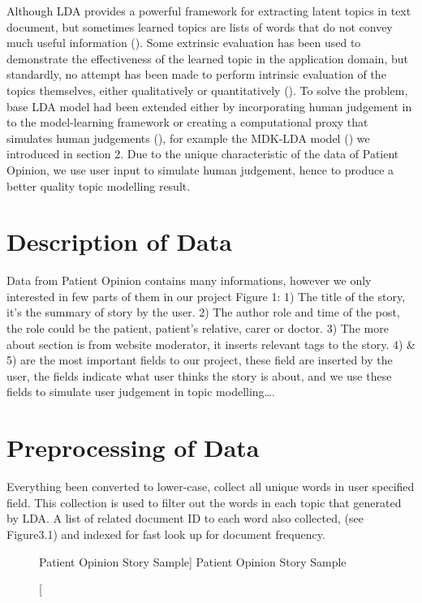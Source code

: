 \documentclass[11pt,twoside]{report}
\begin{document}
Although LDA provides a powerful framework for extracting latent topics in text document, but sometimes learned topics are lists of words that do not convey much useful information (\cite{ref26}). Some extrinsic evaluation has been used to demonstrate the effectiveness of the learned topic in the application domain, but standardly, no attempt has been made to perform intrinsic evaluation of the topics themselves, either qualitatively or quantitatively (\cite{ref27}). To solve the problem, base LDA model had been extended either by incorporating human judgement in to the model-learning framework or creating a computational proxy that simulates human judgements (\cite{ref28}), for example the MDK-LDA model (\cite{ref24}) we introduced in section 2.
Due to the unique characteristic of the data of Patient Opinion, we use user input to simulate human judgement, hence to produce a better quality topic modelling result.

\section{Description of Data}

Data from Patient Opinion contains many informations, however we only interested in few parts of them in our project Figure 1: 1) The title of the story, it’s the summary of story by the user. 2) The author role and time of the post, the role could be the patient, patient’s relative, carer or doctor. 3) The more about section is from website moderator, it inserts relevant tags to the story. 4) \& 5) are the most important fields to our project, these field are inserted by the user, the fields indicate what user thinks the story is about, and we use these fields to simulate user judgement in topic modelling….

\section{Preprocessing of Data}

Everything been converted to lower-case, collect all unique words in user specified field. This collection is used to filter out the words in each topic that generated by LDA. A list of related document ID to each word also collected, (see Figure3.1) and indexed for fast look up for document frequency.

\begin{figure}[tp]
    \begin{center}
    \caption
    [Patient Opinion Story Sample]
    {
    Patient Opinion Story Sample
    \label{Figure4}
    }
    \end{center}
\end{figure}
\end{document}
